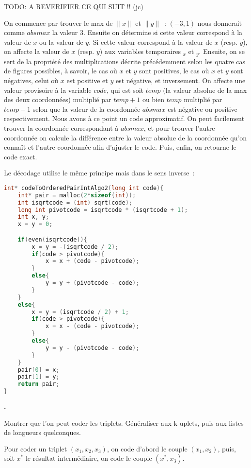 \documentclass{article}
\newcounter{enoncecount}
\newenvironment{enonce}
{
\stepcounter{enoncecount}
\bf\small \arabic{enoncecount}.
\begin{bf}
}
{
\end{bf}
}
\begin{document}
TODO: A REVERIFIER CE QUI SUIT !! (jc)

On commence par trouver le max de $\|x\|$ et $\|y\|$~: $(-3,1)$ nous donnerait comme $absmax$ la valeur $3$. Ensuite on détermine si cette valeur correspond à la valeur de $x$ ou la valeur de $y$. Si cette valeur correspond à la valeur de $x$ (resp. $y$), on affecte la valeur de $x$ (resp. $y$) aux variables temporaires $_x$ et $_y$. Ensuite, on se sert de la propriété des multiplications décrite précédemment selon les quatre cas de figures possibles, à savoir, le cas où $x$ et $y$ sont positives, le cas où $x$ et $y$ sont négatives, celui où $x$ est positive et $y$ est négative, et inversement. On affecte une valeur provisoire à la variable $code$, qui est soit $temp$ (la valeur absolue de la max des deux coordonnées) multiplié par $temp + 1$ ou bien $temp$ multiplié par $temp - 1$ selon que la valeur de la coordonnée $absmax$ est négative ou positive respectivement. Nous avons à ce point un code approximatif. On peut facilement trouver la coordonnée correspondant à $absmax$, et pour trouver l'autre coordonnée on calcule la différence entre la valeur absolue de la coordonnée qu'on connaît et l'autre coordonnée afin d'ajuster le code. Puis, enfin, on retourne le code exact.

Le décodage utilise le même principe mais dans le sens inverse~:

\begin{lstlisting}[language=C]
int* codeToOrderedPairIntAlgo2(long int code){
	int* pair = malloc(2*sizeof(int));
	int isqrtcode = (int) sqrt(code);
	long int pivotcode = isqrtcode * (isqrtcode + 1);
	int x, y;
	x = y = 0;	

	if(even(isqrtcode)){
		x = y = -(isqrtcode / 2);
		if(code > pivotcode){
			x = x + (code - pivotcode);
		}
		else{
			y = y + (pivotcode - code);
		}
	}
	else{
		x = y = (isqrtcode / 2) + 1;
		if(code > pivotcode){
			x = x - (code - pivotcode);
		}
		else{
			y = y - (pivotcode - code); 
		}
	}
	pair[0] = x;
	pair[1] = y; 
	return pair;
}
\end{lstlisting}



\begin{enonce}
Montrer que l'on peut coder les triplets. Généraliser aux k-uplets, puis aux listes de longueurs quelconques.
\end{enonce}

Pour coder un triplet $(x_1, x_2, x_3)$, on code d'abord le couple $(x_1, x_2)$, puis, soit $x^*$ le résultat intermédiaire, on code le couple $(x^*, x_3)$.
\end{document}
